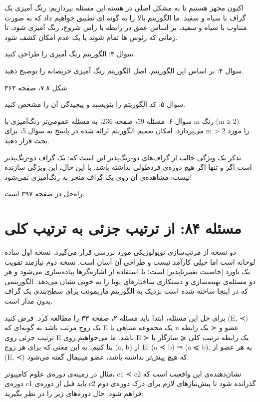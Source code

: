 \documentclass{book} %
\begin{document}
اکنون مجهز هستیم تا به مشکل اصلی در هسته این مسئله بپردازیم: رنگ آمیزی یک گراف با سیاه و سفید. ما الگوریتم بالا را به گونه ای تطبیق خواهیم داد که به صورت متناوب با سیاه و سفید، بر اساس عمق در رابطه با راس شروع، رنگ آمیزی شود، تا زمانی که رئوس ها تمام شوند یا یک عدم امکان کشف شود.

سوال ۳: الگوریتم رنگ آمیزی را طراحی کنید.

سوال ۴: بر اساس این الگوریتم، اصل الگوریتم رنگ آمیزی حریصانه را توضیح دهید.

شکل ۷.۸، صفحه ۳۶۳

سوال ۵: کد الگوریتم را بنویسید و پیچیدگی آن را مشخص کنید.

سوال ۶: مسئله 59، صفحه 236، به مسئله عمومی‌تر رنگ‌آمیزی با m رنگ (m ≥ 2) می‌پردازد.
امکان تعمیم الگوریتم ارائه شده در پاسخ به سوال 5، برای m > 2 را مورد بحث قرار دهید.

تذکر
یک ویژگی جالب از گراف‌های دو-رنگ‌پذیر این است که: یک گراف دو-رنگ‌پذیر است اگر و تنها اگر هیچ دوره‌ی فردطولی نداشته باشد. با این حال، این ویژگی سازنده نیست: مشاهده‌ی آن روی یک گراف منجر به رنگ‌آمیزی نمی‌شود!

راه‌حل در صفحه ۳۹۷ است.

\newpage

\section {مسئله ۸۴: از ترتیب جزئی به ترتیب کلی}

دو نسخه از مرتب‌سازی توپولوژیکی مورد بررسی قرار می‌گیرد. نسخه اول ساده لوحانه است
اما خیلی کارآمد نیست و طراحی آن آسان است. نسخه دوم نیازمند تقویت یک ناورد [خاصیت
تغییرناپذیر] است؛ با استفاده از اشاره‌گرها پیاده‌سازی می‌شود و هر دو مسئله‌ی بهینه‌سازی و
دستکاری ساختارهای پویا را به خوبی نشان می‌دهد. الگوریتمی که در اینجا ساخته شده است
نزدیک به الگوریتم ماریمونت برای سطح‌بندی یک گراف بدون مدار است.

برای حل این مسئله، ابتدا باید مسئله ۲، صفحه ۳۳ را مطالعه کرد.
فرض کنید (E, ≺) یک زوج مرتب باشد به گونه‌ای که E یک مجموعه متناهی با n عضو
و ≺ یک رابطه ترتیب جزئی روی E باشد. ما می‌خواهیم روی E یک رابطه ترتیب کلی
⩽ سازگار با ≺ بنا کنیم، به این معنی که برای هر زوج (a, b) از E: (a ≺ b) ⇒ (a ⩽ b).
به هر عضو از (E, ≺) که هیچ پیش‌تر نداشته باشد، عضو مینیمال گفته می‌شود.


مثال
در زمینه‌ی دوره‌ی علوم کامپیوتر، c1 ≺ c2 نشان‌دهنده‌ی این واقعیت است که دوره‌ی c1 باید
قبل از دوره‌ی c2 گذرانده شود تا پیش‌نیازهای لازم برای درک دوره‌ی دوم فراهم شود.
حال دوره‌های زیر را در نظر بگیرید:
\end{document}
